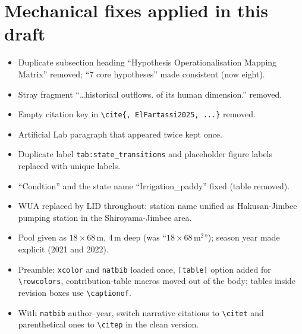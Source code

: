 \documentclass{article}
\begin{document}
\appendix
\section{Mechanical fixes applied in this draft}
\begin{added}
\begin{itemize}
    \item Duplicate subsection heading ``Hypothesis Operationalisation Mapping Matrix'' removed; ``7 core hypotheses'' made consistent (now eight).
    \item Stray fragment ``\ldots historical outflows. of its human dimension.'' removed.
    \item Empty citation key in \verb|\cite{, ElFartassi2025, ...}| removed.
    \item Artificial Lab paragraph that appeared twice kept once.
    \item Duplicate label \texttt{tab:state\_transitions} and placeholder figure labels replaced with unique labels.
    \item ``Condtion'' and the state name ``Irrigation\_paddy'' fixed (table removed).
    \item WUA replaced by LID throughout; station name unified as Hakusan-Jimbee pumping station in the Shiroyama-Jimbee area.
    \item Pool given as $18\times68$\,m, 4\,m deep (was ``$18\times68$\,m$^2$''); season year made explicit (2021 and 2022).
    \item Preamble: \texttt{xcolor} and \texttt{natbib} loaded once, \texttt{[table]} option added for \verb|\rowcolors|, contribution-table macros moved out of the body; tables inside revision boxes use \verb|\captionof|.
    \item With \texttt{natbib} author--year, switch narrative citations to \verb|\citet| and parenthetical ones to \verb|\citep| in the clean version.
\end{itemize}
\end{added}



\end{document}
